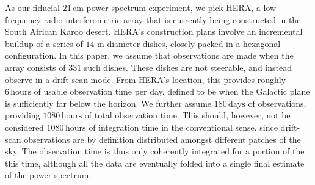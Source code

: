 \documentclass[twocolumn,aps,prd,nofootinbib,showpacs]{revtex4-1}
\begin{document}
As our fiducial $21\,\textrm{cm}$ power spectrum experiment, we pick HERA, a low-frequency radio interferometric array that is currently being constructed in the South African Karoo desert. HERA's construction plans involve an incremental buildup of a series of $14$-m diameter dishes, closely packed in a hexagonal configuration. In this paper, we assume that observations are made when the array consists of $331$ such dishes. These dishes are not steerable, and instead observe in a drift-scan mode. From HERA's location, this provides roughly $6\,\textrm{hours}$ of usable observation time per day, defined to be when the Galactic plane is sufficiently far below the horizon. We further assume $180\,\textrm{days}$ of observations, providing $1080\,\textrm{hours}$ of total observation time. This should, however, not be considered $1080\,\textrm{hours}$ of integration time in the conventional sense, since drift-scan observations are by definition distributed amongst different patches of the sky. The observation time is thus only coherently integrated for a portion of the this time, although all the data are eventually folded into a single final estimate of the power spectrum.
\end{document}
